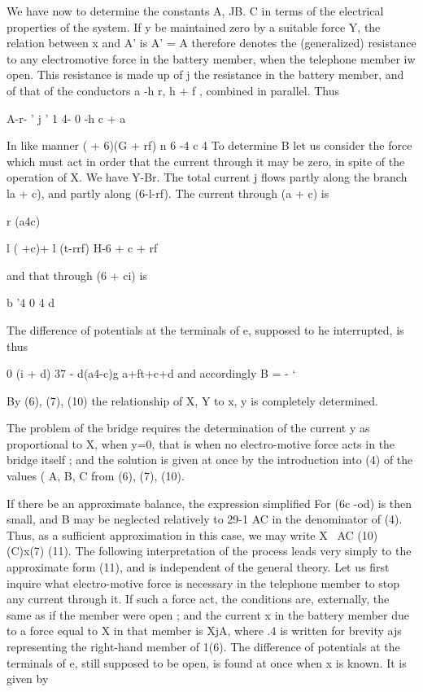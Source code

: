 We have now to determine the constants A, JB. C in terms of
the electrical properties of the system. If y be maintained zero by a suitable
force Y, the relation between x and A' is A' = A therefore denotes the
(generalized) resistance to any electromotive force in the battery member, when
the telephone member iw open. This resistance is made up of j the resistance in
the battery member, and of that of the conductors a -h r, h + f , combined in
parallel. Thus

A-r-   ' j ' 1 4- 0 -h c + a

In like manner ( + 6)(G + rf) n 6 -4 c 4 To determine B let us consider the
force which must act in order that the current through it may be
zero, in spite of the operation of X. We have Y-Br. The total current j flows
partly along the branch la + c), and partly along (6-l-rf).  The current
through (a + c) is

r (a4c)

l ( +c)+ l (t-rrf) H-6 + c + rf

and that through (6 + ci) is

b '4 0 4 d

The difference of potentials at the terminals of e, supposed to he interrupted,
is thus

0 (i + d) 37 - d(a4-c)g a+ft+c+d and accordingly B = - ‘

By (6), (7), (10) the relationship of X, Y to x, y is completely determined.

The problem of the bridge requires the determination of the current y as
proportional to X, when y=0, that is when no electro-motive force acts in the
bridge itself ; and the solution is given at once by the introduction into (4)
of the values ( A, B, C from (6), (7), (10).

If there be an approximate  balance, the expression simplified For (6c -od) is
then small, and B may be neglected relatively to 29-1 AC in the denominator of
(4). Thus, as a sufficient approximation in this case, we may write X~ AC (10)
(C)x(7) (11).  The following interpretation of the process leads very simply to
the approximate form (11), and is independent of the general theory. Let us
first inquire what electro-motive force is necessary in the telephone member to
stop any current through it. If such a force act, the conditions are,
externally, the same as if the member were open ; and the current x in the
battery member due to a force equal to X in that member is XjA, where .4 is
written for brevity ajs representing the right-hand member of 1(6). The
difference of potentials at the terminals of e, still supposed to be open, is
found at once when x is known. It is given by

